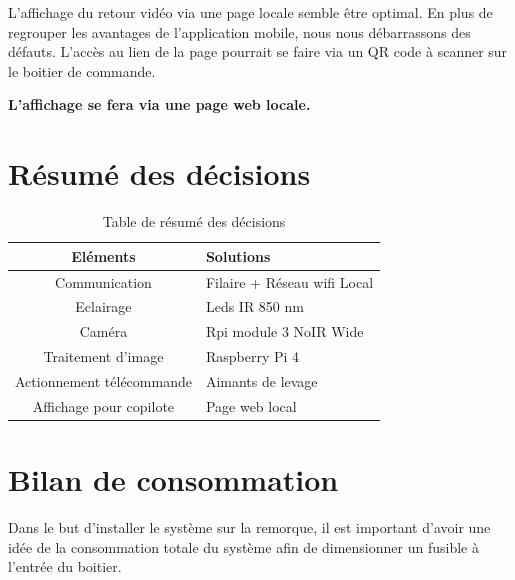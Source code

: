 L'affichage du retour vidéo via une page locale semble être optimal. En plus de regrouper les avantages de l'application mobile, nous nous débarrassons des défauts.
L'accès au lien de la page pourrait se faire via un QR code à scanner sur le boitier de commande.

\textbf{L'affichage se fera via une page web locale.}

\section{Résumé des décisions}
\begin{table}[H]
    \begin{center}
        \caption{Table de résumé des décisions}
        \begin{tabular}{|c|l|}
            Eléments                  & Solutions                         \\ \hline
            Communication             & Filaire + Réseau \Gls{wifi} Local \\
            Eclairage                 & Leds IR 850 \si{\nano\metre}      \\
            Caméra                    & Rpi module 3 NoIR Wide            \\
            Traitement d'image        & Raspberry Pi 4                    \\
            Actionnement télécommande & Aimants de levage                 \\
            Affichage pour copilote   & Page web local                    \\
        \end{tabular}
    \end{center}
\end{table}
\newpage
\section{Bilan de consommation}
Dans le but d'installer le système sur la remorque, il est important d'avoir une idée de la consommation totale du système afin de dimensionner
un fusible à l'entrée du boitier.

